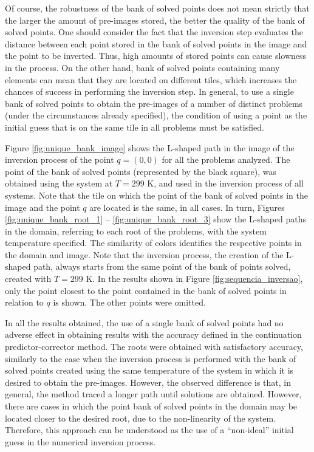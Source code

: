 \documentclass[journal=iecred,manuscript=article]{achemso}
\theoremstyle{definition}
\theoremstyle{remark}
\begin{document}
Of course, the robustness of the bank of solved points does not mean strictly that the larger the amount of pre-images stored, the better the quality of the bank of solved points. One should consider the fact that the inversion step evaluates the distance between each point stored in the bank of solved points in the image and the point to be inverted. Thus, high amounts of stored points can cause slowness in the process. On the other hand, bank of solved points containing many elements can mean that they are located on different tiles, which increases the chances of success in performing the inversion step. In general, to use a single bank of solved points to obtain the pre-images of a number of distinct problems (under the circumstances already specified), the condition of using a point as the initial guess that is on the same tile in all problems must be satisfied.

Figure \ref{fig:unique_bank_image} shows the L-shaped path in the image of the inversion process of the point $ q = \left(0,0\right) $ for all the problems analyzed. The point of the bank of solved points (represented by the black square), was obtained using the system at $ T = 299 $ K, and used in the inversion process of all systems. Note that the tile on which the point of the bank of solved points in the image and the point $ q $ are located is the same, in all cases. In turn, Figures \ref{fig:unique_bank_root_1} -- \ref{fig:unique_bank_root_3} show the L-shaped paths in the domain, referring to each root of the problems, with the system temperature specified. The similarity of colors identifies the respective points in the domain and image. Note that the inversion process, the creation of the L-shaped path, always starts from the same point of the bank of points solved, created with $ T = 299 $ K. In the results shown in Figure \ref{fig:sequencia_inversao}, only the point closest to the point contained in the bank of solved points in relation to $ q $ is shown. The other points were omitted.

In all the results obtained, the use of a single bank of solved points had no adverse effect in obtaining results with the accuracy defined in the continuation predictor-corrector method. The roots were obtained with satisfactory accuracy, similarly to the case when the inversion process is performed with the bank of solved points created using the same temperature of the system in which it is desired to obtain the pre-images. However, the observed difference is that, in general, the method traced a longer path until solutions are obtained. However, there are cases in which the point bank of solved points in the domain may be located closer to the desired root, due to the non-linearity of the system. Therefore, this approach can be understood as the use of a \enquote{non-ideal} initial guess in the numerical inversion process.
\end{document}
